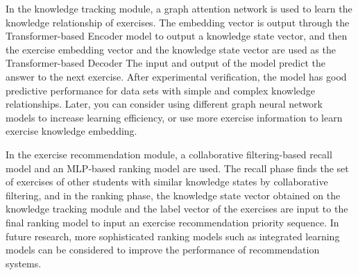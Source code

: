 
In the knowledge tracking module, a graph attention network is used to learn the knowledge relationship of exercises. The embedding vector is output through the Transformer-based Encoder model to output a knowledge state vector, and then the exercise embedding vector and the knowledge state vector are used as the Transformer-based Decoder The input and output of the model predict the answer to the next exercise. After experimental verification, the model has good predictive performance for data sets with simple and complex knowledge relationships. Later, you can consider using different graph neural network models to increase learning efficiency, or use more exercise information to learn exercise knowledge embedding.


In the exercise recommendation module, a collaborative filtering-based recall model and an MLP-based ranking model are used. The recall phase finds the set of exercises of other students with similar knowledge states by collaborative filtering, and in the ranking phase, the knowledge state vector obtained on the knowledge tracking module and the label vector of the exercises are input to the final ranking model to input an exercise recommendation priority sequence. In future research, more sophisticated ranking models such as integrated learning models can be considered to improve the performance of recommendation systems.